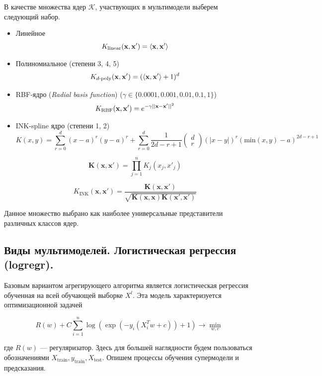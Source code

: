 \documentclass[12pt,twoside]{article}
\theoremstyle{plain}
\theoremstyle{remark}
\theoremstyle{definition}
\begin{document}
В качестве множества ядер $\mathcal{K}$, участвующих в мультимодели выберем следующий набор.

\begin{itemize}
    \item Линейное
    $$
    K_{\text{linear}}(\mathbf{x}, \mathbf{x'}) = \left\langle \mathbf{x}, \mathbf{x'} \right\rangle
    $$
    \item Полиномиальное (степени 3, 4, 5)
    $$
    K_{d\text{-poly}}(\mathbf{x}, \mathbf{x'}) = (\left\langle \mathbf{x}, \mathbf{x'} \right\rangle + 1)^d
    $$
    \item RBF-ядро (\emph{Radial basis function}) ($\gamma \in \{0.0001, 0.001, 0.01, 0.1, 1\}$)
    $$
    K_{\text{RBF}}(\mathbf{x}, \mathbf{x'}) = e^{-\gamma ||\mathbf{x} - \mathbf{x'}||^2}
    $$
    \item INK-spline ядро\cite{Izmailov2013} (степени 1, 2)
    $$
K(x, y) = \sum_{r=0}^{d} (x-a)^r(y-a)^r + \sum_{r=0}^{d} \frac{1}{2d - r + 1} \begin{pmatrix} d\\r \end{pmatrix}
(|x - y|)^r(\mathrm{min}(x, y)  - a)^{2d - r + 1}
$$

$$
\mathbf{K}(\mathbf{x}, \mathbf{x'}) = \prod_{j=1}^n K_j(x_j, x'_j)
$$

$$
K_{\text{INK}}(\mathbf{x}, \mathbf{x'}) = \frac{\mathbf{K}(\mathbf{x}, \mathbf{x'})}{\sqrt{\mathbf{K}(\mathbf{x}, \mathbf{x})
\mathbf{K}(\mathbf{x'}, \mathbf{x'})}}
$$
\end{itemize}

Данное множество выбрано как наиболее универсальные представители различных классов ядер. 

\subsection{Виды мультимоделей. Логистическая регрессия (logregr).}

Базовым вариантом агрегирующего алгоритма является логистическая регрессия обученная на всей обучающей выборке $X^l$. Эта модель характеризуется оптимизационной задачей

\begin{equation}\label{logregr}
	R(w) + C \sum_{i=1}^n \log(\exp(- y_i (X_i^T w + c)) + 1) \to \min_{w, c}
\end{equation}

где $R(w)$ --- регуляризатор.
Здесь для большей наглядности будем пользоваться обозначениями $X_{\text{train}}, y_{\text{train}}, X_{\text{test}}$. Опишем процессы обучения супермодели и предсказания.
\end{document}
